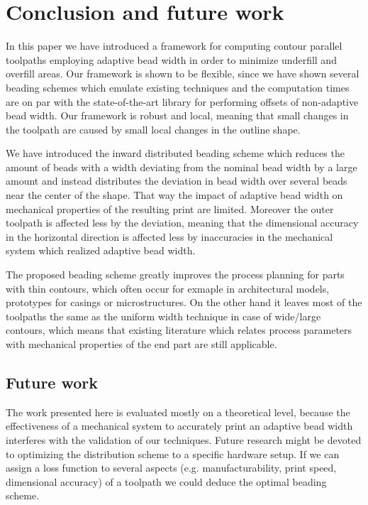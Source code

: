 \section{Conclusion and future work}
In this paper we have introduced a framework for computing contour parallel toolpaths employing adaptive bead width in order to minimize underfill and overfill areas.
Our framework is shown to be flexible, since we have shown several beading schemes which emulate existing techniques and the computation times are on par with the state-of-the-art library for performing offsets of non-adaptive bead width.
Our framework is robust and local, meaning that small changes in the toolpath are caused by small local changes in the outline shape.

We have introduced the inward distributed beading scheme which reduces the amount of beads with a width deviating from the nominal bead width by a large amount
and instead distributes the deviation in bead width over several beads near the center of the shape.
That way the impact of adaptive bead width on mechanical properties of the resulting print are limited.
Moreover the outer toolpath is affected less by the deviation, meaning that the dimensional accuracy in the horizontal direction is affected less by inaccuracies in the mechanical system which realized adaptive bead width.

The proposed beading scheme greatly improves the process planning for parts with thin contours, which often occur for exmaple in architectural models, prototypes for casings or microstructures.
On the other hand it leaves most of the toolpaths the same as the uniform width technique in case of wide/large contours, which means that existing literature which relates process parameters with mechanical properties of the end part are still applicable.


\subsection{Future work}
The work presented here is evaluated mostly on a theoretical level, because the effectiveness of a mechanical system to accurately print an adaptive bead width interferes with the validation of our techniques.
Future research might be devoted to optimizing the distribution scheme to a specific hardware setup.
If we can assign a loss function to several aspects (e.g. manufacturability, print speed, dimensional accuracy) of a toolpath we could deduce the optimal beading scheme.

